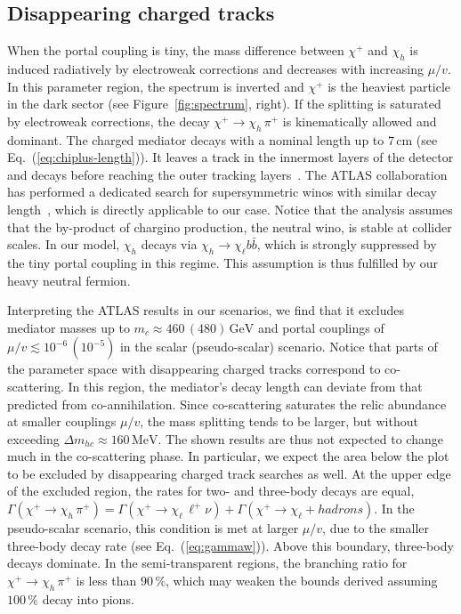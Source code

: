\documentclass[nofootinbib,prd,aps,superscriptaddress,preprintnumbers]{revtex4}
\begin{document}
\subsection{Disappearing charged tracks}\noindent When the portal coupling is tiny, the mass difference between $\chi^+$ and $\chi_h$ is induced radiatively by electroweak corrections and decreases with increasing $\mu/v$. In this parameter region, the spectrum is inverted and $\chi^+$ is the heaviest particle in the dark sector (see Figure~\ref{fig:spectrum}, right). If the splitting is saturated by electroweak corrections, the decay $\chi^+\to \chi_h\,\pi^+$ is kinematically allowed and dominant. The charged mediator decays with a nominal length up to $7\,\text{cm}$ (see Eq.~(\ref{eq:chiplus-length})). It leaves a track in the innermost layers of the detector and decays before reaching the outer tracking layers~\cite{Ibe:2006de,Buckley:2009kv,Mahbubani:2017gjh}. The ATLAS collaboration has performed a dedicated search for supersymmetric winos with similar decay length~\cite{Aaboud:2017mpt}, which is directly applicable to our case. Notice that the analysis assumes that the by-product of chargino production, the neutral wino, is stable at collider scales. In our model, $\chi_h$ decays via $\chi_h \to \chi_\ell b\bar{b}$, which is strongly suppressed by the tiny portal coupling in this regime. This assumption is thus fulfilled by our heavy neutral fermion.

Interpreting the ATLAS results in our scenarios, we find that it excludes mediator masses up to $m_c \approx 460\,(480)\,\text{GeV}$ and portal couplings of $\mu/v \lesssim 10^{-6}\,(10^{-5})$ in the scalar (pseudo-scalar) scenario. Notice that parts of the parameter space with disappearing charged tracks correspond to co-scattering. In this region, the mediator's decay length can deviate from that predicted from co-annihilation. Since co-scattering saturates the relic abundance at smaller couplings $\mu/v$, the mass splitting tends to be larger, but without exceeding $\Delta m_{hc} \approx 160\,\text{MeV}$. The shown results are thus not expected to change much in the co-scattering phase. In particular, we expect the area below the plot to be excluded by disappearing charged track searches as well. At the upper edge of the excluded region, the rates for two- and three-body decays are equal, $\Gamma(\chi^+\to \chi_h\,\pi^+)=\Gamma(\chi^+\to \chi_\ell\,\ell^+\nu) + \Gamma(\chi^+\to \chi_\ell + hadrons)$.  In the pseudo-scalar scenario, this condition is met at larger $\mu/v$, due to the smaller three-body decay rate (see Eq.~(\ref{eq:gammaw})). Above this boundary, three-body decays dominate. In the semi-transparent regions, the branching ratio for $\chi^+\to \chi_h\,\pi^+$ is less than $90\,\%$, which may weaken the bounds derived assuming $100\,\%$ decay into pions.
\end{document}
